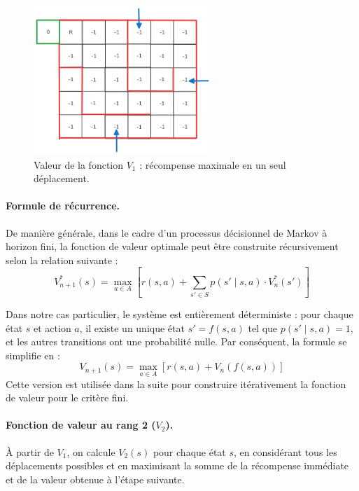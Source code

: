 \documentclass[12pt]{article}
\begin{document}
\vspace{1em}
\begin{figure}[h]
    \centering
    \includegraphics[width=0.6\textwidth]{labyrinthev1.png}
    \caption{Valeur de la fonction \(V_1\) : récompense maximale en un seul déplacement.}
    \label{fig:V1}
\end{figure}

\paragraph{Formule de récurrence.}

De manière générale, dans le cadre d’un processus décisionnel de Markov à horizon fini, la fonction de valeur optimale peut être construite récursivement selon la relation suivante :
\[
V_{n+1}^{*}(s) = \max_{a \in A} \left[ r(s,a) + \sum_{s' \in S} p(s' \mid s, a) \cdot V_n^{*}(s') \right]
\]

Dans notre cas particulier, le système est entièrement déterministe : pour chaque état \(s\) et action \(a\), il existe un unique état \(s' = f(s,a)\) tel que \(p(s' \mid s, a) = 1\), et les autres transitions ont une probabilité nulle. Par conséquent, la formule se simplifie en :
\[
V_{n+1}(s) = \max_{a \in A} \left[ r(s,a) + V_n(f(s,a)) \right]
\]
Cette version est utilisée dans la suite pour construire itérativement la fonction de valeur pour le critère fini.


\paragraph{Fonction de valeur au rang 2 (\(V_2\)).}

À partir de \(V_1\), on calcule \(V_2(s)\) pour chaque état \(s\), en considérant tous les déplacements possibles et en maximisant la somme de la récompense immédiate et de la valeur obtenue à l’étape suivante.
\end{document}
